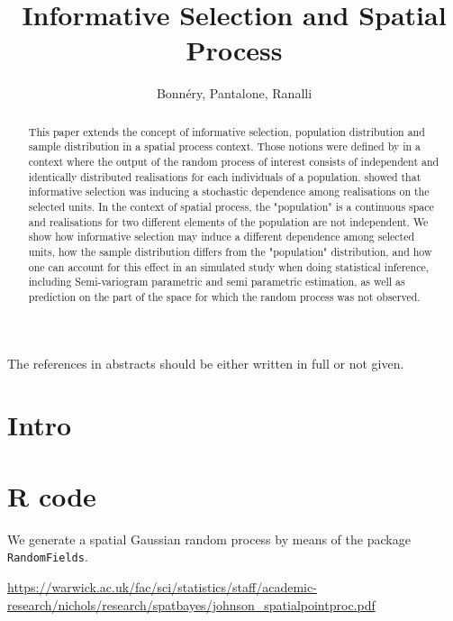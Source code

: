 \documentclass[12pt]{article}
\title{Informative Selection and Spatial Process}
\date{}
\author{Bonn\'ery,  Pantalone, Ranalli}
\theoremstyle{definition}
\theoremstyle{remark}
\begin{document}
\normalem %

\maketitle

\tableofcontents

\begin{abstract}
This paper extends the concept of informative selection, population distribution and sample distribution in a spatial process context.
Those notions were defined by 
\cite{pfefferman_1992} in a context where the output of the random process of interest consists of independent and identically distributed realisations for each individuals of a population. \cite{BonneryBreidtCoquet} showed that informative selection was inducing a stochastic dependence among realisations on the selected units. In the context of spatial process, the "population" is a continuous space and realisations for two different elements of the population are not independent. We show how informative selection may induce a different dependence among selected units, how the sample distribution differs from the "population" distribution, and how one can  account for this effect in an simulated study when doing statistical inference, including Semi-variogram parametric and semi parametric estimation, as well as prediction on the part of the space for which the random process was not observed.
\end{abstract}

{\color{red} The references in abstracts should be either written in full or not given}.

\section{Intro}








\appendix

\section{R code}


We generate a spatial Gaussian random process by means of the package \texttt{RandomFields}.





\url{https://warwick.ac.uk/fac/sci/statistics/staff/academic-research/nichols/research/spatbayes/johnson_spatialpointproc.pdf}
\end{document}
